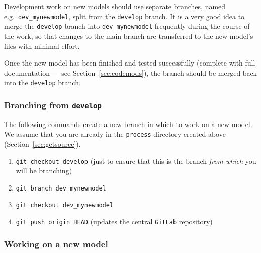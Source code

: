 Development work on new models should use separate branches, named e.g.\
\texttt{dev\_mynewmodel}, split from the \texttt{develop} branch. It is a very
good idea to merge the \texttt{develop} branch into \texttt{dev\_mynewmodel}
frequently during the course of the work, so that changes to the main branch
are transferred to the new model's files with minimal effort.

Once the new model has been finished and tested successfully (complete with full
documentation --- see Section~\ref{sec:codemods}), the branch should be merged
back into the \texttt{develop} branch.

\subsubsection{Branching from \texttt{develop}}

The following commands create a new branch in which to work on a new model. We
assume that you are already in the \texttt{process} directory created above
(Section~\ref{sec:getsource}).
\begin{enumerate}

\item \texttt{git checkout develop} (just to ensure that this is the branch
  \textit{from which}\/ you will be branching)

\item \texttt{git branch dev\_mynewmodel}

\item \texttt{git checkout dev\_mynewmodel}

\item \texttt{git push origin HEAD}  (updates the central \texttt{GitLab} repository)

\end{enumerate}

\subsubsection{Working on a new model}

